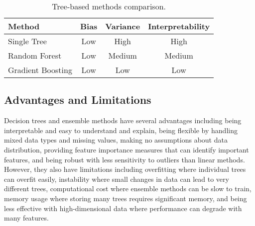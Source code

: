 \begin{table}[htbp]
\centering
\begin{tabular}{lccc}
\toprule
Method & Bias & Variance & Interpretability \\
\midrule
Single Tree & Low & High & High \\
Random Forest & Low & Medium & Medium \\
Gradient Boosting & Low & Low & Low \\
\bottomrule
\end{tabular}
\caption{Tree-based methods comparison.}
\label{tab:ensemble-comparison}
\end{table}

\subsection{Advantages and Limitations}

Decision trees and ensemble methods have several advantages including being interpretable and easy to understand and explain, being flexible by handling mixed data types and missing values, making no assumptions about data distribution, providing feature importance measures that can identify important features, and being robust with less sensitivity to outliers than linear methods. However, they also have limitations including overfitting where individual trees can overfit easily, instability where small changes in data can lead to very different trees, computational cost where ensemble methods can be slow to train, memory usage where storing many trees requires significant memory, and being less effective with high-dimensional data where performance can degrade with many features.

